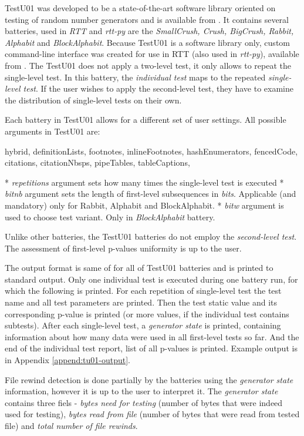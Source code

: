 \documentclass[
  digital,     %
  oneside,     %
  nosansbold,  %
  nocolorbold, %
  nolof,         %
  nolot,         %
]{fithesis4}
\begin{document}
TestU01 was developed to be a state-of-the-art software library oriented on testing of random number generators and is available from \cite{tu01_site}. It contains several batteries, used in \emph{RTT} and \emph{rtt-py} are the \emph{SmallCrush, Crush, BigCrush, Rabbit, Alphabit} and \emph{BlockAlphabit}. Because TestU01 is a software library only, custom command-line interface was created for use in RTT (also used in \emph{rtt-py}), available from \cite{rtt-batteries}. The TestU01 does not apply a two-level test, it only allows to repeat the single-level test. In this battery, the \emph{individual test} maps to the repeated \emph{single-level test}. If the user wishes to apply the second-level test, they have to examine the distribution of single-level tests on their own.

Each battery in TestU01 allows for a different set of user settings. All possible arguments in TestU01 are:
\begin{markdown*}{%
  hybrid,
  definitionLists,
  footnotes,
  inlineFootnotes,
  hashEnumerators,
  fencedCode,
  citations,
  citationNbsps,
  pipeTables,
  tableCaptions,
}

* \emph{repetitions} argument sets how many times the single-level test is executed
* \emph{bit\textunderscore nb} argument sets the length of first-level subsequences in \emph{bits}. Applicable (and mandatory) only for Rabbit, Alphabit and BlockAlphabit.
* \emph{bit\textunderscore w} argument is used to choose test variant. Only in \emph{BlockAlphabit} battery.
\end{markdown*}
Unlike other batteries, the TestU01 batteries do not employ the \emph{second-level test}. The assessment  of first-level p-values uniformity is up to the user. 

The output format is same of for all of TestU01 batteries and is printed to standard output. Only one individual test is executed during one battery run, for which the following is printed. For each repetition of single-level test the test name and all test parameters are printed. Then the test static value and its corresponding p-value is printed (or more values, if the individual test contains subtests). After each single-level test, a \emph{generator state} is printed, containing information about how many data were used in all first-level tests so far. And the end of the individual test report, list of all p-values is printed. Example output is in Appendix \ref{append:tu01-output}.

File rewind detection is done partially by the batteries using the \emph{generator state} information, however it is up to the user to interpret it. The \emph{generator state} contains three fiels - \emph{bytes need for testing} (number of bytes that were indeed used for testing), \emph{bytes read from file} (number of bytes that were read from tested file) and \emph{total number of file rewinds}. 
\end{document}
